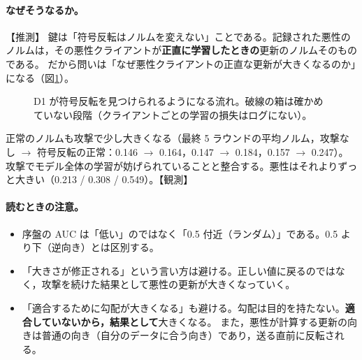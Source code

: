 \documentclass[a4j, dvipdfmx]{jsarticle}  %
\begin{document}
\paragraph{なぜそうなるか。}【推測】
鍵は「符号反転はノルムを変えない」ことである。記録された悪性のノルムは，その悪性クライアントが\textbf{正直に学習したときの}更新のノルムそのものである。
だから問いは「なぜ悪性クライアントの正直な更新が大きくなるのか」になる（図\ref{fig:sf-d1-flow}）。

\begin{figure}[H]
\centering
{}
\caption{D1 が符号反転を見つけられるようになる流れ。破線の箱は確かめていない段階（クライアントごとの学習の損失はログにない）。}
\label{fig:sf-d1-flow}
\end{figure}

正常のノルムも攻撃で少し大きくなる（最終 5 ラウンドの平均ノルム，攻撃なし $\rightarrow$ 符号反転の正常：0.146 $\rightarrow$ 0.164，0.147 $\rightarrow$ 0.184，0.157 $\rightarrow$ 0.247）。
攻撃でモデル全体の学習が妨げられていることと整合する。悪性はそれよりずっと大きい（0.213 / 0.308 / 0.549）。【観測】

\paragraph{読むときの注意。}
\begin{itemize}
  \item 序盤の AUC は「低い」のではなく「0.5 付近（ランダム）」である。0.5 より下（逆向き）とは区別する。
  \item 「大きさが修正される」という言い方は避ける。正しい値に戻るのではなく，攻撃を続けた結果として悪性の更新が大きくなっていく。
  \item 「適合するために勾配が大きくなる」も避ける。勾配は目的を持たない。\textbf{適合していないから，結果として}大きくなる。
        また，悪性が計算する更新の向きは普通の向き（自分のデータに合う向き）であり，送る直前に反転される。
\end{itemize}
\end{document}
